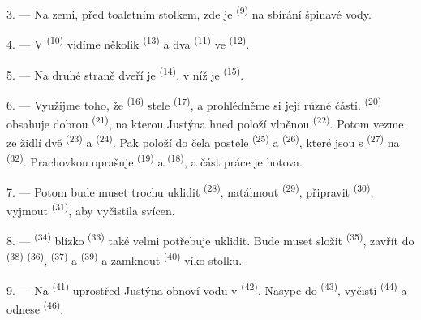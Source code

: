 3. --- Na zemi, před toaletním stolkem, zde je  \textsuperscript{(9)} na
sbírání špinavé vody.

4. --- V  \textsuperscript{(10)} vidíme několik 
\textsuperscript{(13)} a dva  \textsuperscript{(11)} ve
 \textsuperscript{(12)}.

5. --- Na druhé straně dveří je  \textsuperscript{(14)}, v níž je
 \textsuperscript{(15)}.

6. --- Využijme toho, že  \textsuperscript{(16)} stele 
\textsuperscript{(17)}, a prohlédněme si její různé části. 
\textsuperscript{(20)} obsahuje dobrou  \textsuperscript{(21)}, na
kterou Justýna hned položí vlněnou  \textsuperscript{(22)}. Potom vezme ze
židlí dvě  \textsuperscript{(23)} a 
\textsuperscript{(24)}. Pak položí do čela postele 
\textsuperscript{(25)} a  \textsuperscript{(26)}, které jsou s
 \textsuperscript{(27)} na
 \textsuperscript{(32)}. Prachovkou oprašuje 
\textsuperscript{(19)} a  \textsuperscript{(18)}, a část práce je hotova.

7. --- Potom bude muset trochu uklidit  \textsuperscript{(28)}, natáhnout
 \textsuperscript{(29)}, připravit 
\textsuperscript{(30)}, vyjmout  \textsuperscript{(31)}, aby vyčistila svícen.

\VUsaut{5.0mm}
\VUsaut{3.0mm}

8. ---  \textsuperscript{(34)} blízko 
\textsuperscript{(33)} také velmi potřebuje uklidit. Bude muset složit 
\textsuperscript{(35)}, zavřít do  \textsuperscript{(38)}
  \textsuperscript{(36)}, 
\textsuperscript{(37)} a  \textsuperscript{(39)} a zamknout
 \textsuperscript{(40)} víko stolku.

9. --- Na  \textsuperscript{(41)} uprostřed Justýna obnoví vodu v
 \textsuperscript{(42)}. Nasype  do
 \textsuperscript{(43)}, vyčistí 
\textsuperscript{(44)} a odnese  \textsuperscript{(46)}.

